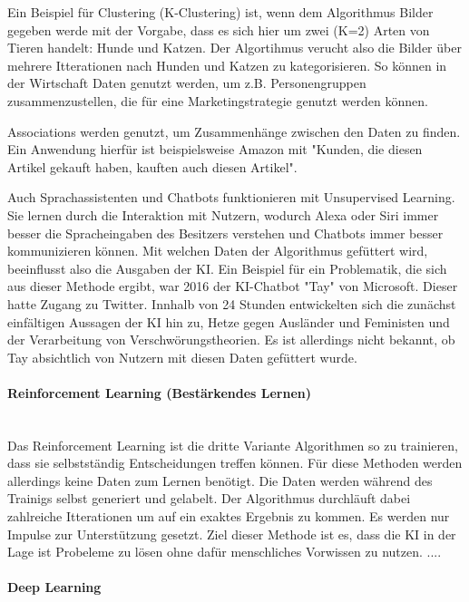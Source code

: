 \documentclass[a4paper,12pt, german]{report}
\begin{document}
Ein Beispiel für Clustering (K-Clustering) ist, wenn dem Algorithmus Bilder gegeben werde mit der Vorgabe, dass es sich hier um zwei (K=2) Arten von Tieren handelt: Hunde und Katzen. Der Algortihmus verucht also die Bilder über mehrere Itterationen nach Hunden und Katzen zu kategorisieren. So können in der Wirtschaft Daten genutzt werden, um z.B. Personengruppen zusammenzustellen, die für eine Marketingstrategie genutzt werden können.

Associations werden genutzt, um Zusammenhänge zwischen den Daten zu finden. Ein Anwendung hierfür ist beispielsweise Amazon mit "Kunden, die diesen Artikel gekauft haben, kauften auch diesen Artikel".

Auch Sprachassistenten und Chatbots funktionieren mit Unsupervised Learning. Sie lernen durch die Interaktion mit Nutzern, wodurch Alexa oder Siri immer besser die Spracheingaben des Besitzers verstehen und Chatbots immer besser kommunizieren können. Mit welchen Daten der Algorithmus gefüttert wird, beeinflusst also die Ausgaben der KI. Ein Beispiel für ein Problematik, die sich aus dieser Methode ergibt, war 2016 der KI-Chatbot "Tay" von Microsoft. Dieser hatte Zugang zu Twitter. Innhalb von 24 Stunden entwickelten sich die zunächst einfältigen Aussagen der KI hin zu, Hetze gegen Ausländer und Feministen und der Verarbeitung von Verschwörungstheorien. Es ist allerdings nicht bekannt, ob Tay absichtlich von Nutzern mit diesen Daten gefüttert wurde. 




\paragraph{Reinforcement Learning (Bestärkendes Lernen)} $ $ \\ Das Reinforcement Learning ist die dritte Variante Algorithmen so zu trainieren, dass sie selbstständig Entscheidungen treffen können. Für diese Methoden werden allerdings keine Daten zum Lernen benötigt. Die Daten werden während des Trainigs selbst generiert und gelabelt. Der Algorithmus durchläuft dabei zahlreiche Itterationen um auf ein exaktes Ergebnis zu kommen. Es werden nur Impulse zur Unterstützung gesetzt. Ziel dieser Methode ist es, dass die KI in der Lage ist Probeleme zu lösen ohne dafür menschliches Vorwissen zu nutzen.
....%




\paragraph{Deep Learning} %
\end{document}
